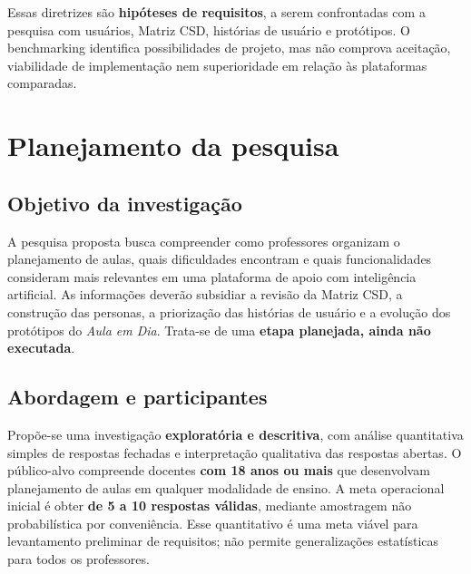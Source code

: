 \documentclass[12pt,a4paper,oneside]{report}
\begin{document}
Essas diretrizes são \textbf{hipóteses de requisitos}, a serem confrontadas com a pesquisa com usuários, Matriz CSD, histórias de usuário e protótipos. O benchmarking identifica possibilidades de projeto, mas não comprova aceitação, viabilidade de implementação nem superioridade em relação às plataformas comparadas.


\section{Planejamento da pesquisa}
\subsection{Objetivo da investigação}
A pesquisa proposta busca compreender como professores organizam o planejamento de aulas, quais dificuldades encontram e quais funcionalidades consideram mais relevantes em uma plataforma de apoio com inteligência artificial. As informações deverão subsidiar a revisão da Matriz CSD, a construção das personas, a priorização das histórias de usuário e a evolução dos protótipos do \textit{Aula em Dia}. Trata-se de uma \textbf{etapa planejada, ainda não executada}.

\subsection{Abordagem e participantes}
Propõe-se uma investigação \textbf{exploratória e descritiva}, com análise quantitativa simples de respostas fechadas e interpretação qualitativa das respostas abertas. O público-alvo compreende docentes \textbf{com 18 anos ou mais} que desenvolvam planejamento de aulas em qualquer modalidade de ensino. A meta operacional inicial é obter \textbf{de 5 a 10 respostas válidas}, mediante amostragem não probabilística por conveniência. Esse quantitativo é uma meta viável para levantamento preliminar de requisitos; não permite generalizações estatísticas para todos os professores.
\end{document}
